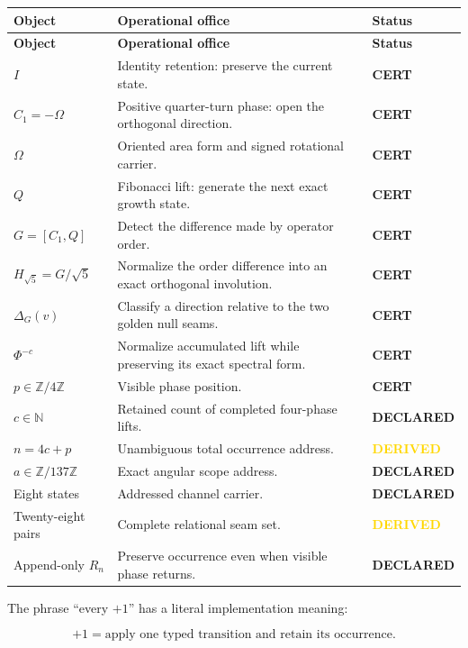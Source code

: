\documentclass[11pt,letterpaper]{article}
\theoremstyle{clearonyx}
\newcommand{\Z}{\mathbb{Z}}
\newcommand{\N}{\mathbb{N}}
\newcommand{\statuscert}{\textcolor{certgreen}{\textbf{CERT}}}
\newcommand{\statusderived}{\textcolor{gold}{\textbf{DERIVED}}}
\newcommand{\statusdeclared}{\textcolor{declareblue}{\textbf{DECLARED}}}
\begin{document}
\begin{longtable}{@{}p{}p{}p{}@{}}
\toprule
\textbf{Object} & \textbf{Operational office} & \textbf{Status}\\
\midrule
\endfirsthead
\toprule
\textbf{Object} & \textbf{Operational office} & \textbf{Status}\\
\midrule
\endhead
$I$ & Identity retention: preserve the current state. & \statuscert\\
$C_1=-\Omega$ & Positive quarter-turn phase: open the orthogonal direction. & \statuscert\\
$\Omega$ & Oriented area form and signed rotational carrier. & \statuscert\\
$Q$ & Fibonacci lift: generate the next exact growth state. & \statuscert\\
$G=[C_1,Q]$ & Detect the difference made by operator order. & \statuscert\\
$H_{\sqrt5}=G/\sqrt5$ & Normalize the order difference into an exact orthogonal involution. & \statuscert\\
$\Delta_G(v)$ & Classify a direction relative to the two golden null seams. & \statuscert\\
$\Phi^{-c}$ & Normalize accumulated lift while preserving its exact spectral form. & \statuscert\\
$p\in\Z/4\Z$ & Visible phase position. & \statuscert\\
$c\in\N$ & Retained count of completed four-phase lifts. & \statusdeclared\\
$n=4c+p$ & Unambiguous total occurrence address. & \statusderived\\
$a\in\Z/137\Z$ & Exact angular scope address. & \statusdeclared\\
Eight states & Addressed channel carrier. & \statusdeclared\\
Twenty-eight pairs & Complete relational seam set. & \statusderived\\
Append-only $R_n$ & Preserve occurrence even when visible phase returns. & \statusdeclared\\
\bottomrule
\end{longtable}

The phrase ``every $+1$'' has a literal implementation meaning:

\begin{equation}
\boxed{+1=\text{apply one typed transition and retain its occurrence}.}
\end{equation}
\end{document}
